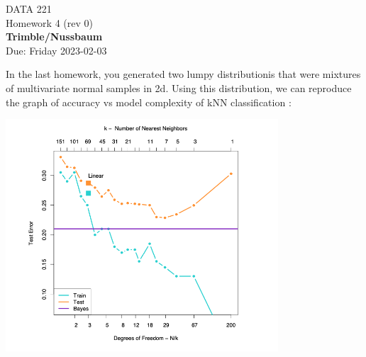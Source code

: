 \documentclass[12pt]{book}
\theoremstyle{definition}
\begin{document}
\begin{center}
{\Large DATA 221 \\  Homework 4  (rev 0)}\\
\textbf{Trimble/Nussbaum}\\ %
Due: Friday 2023-02-03 
\end{center}

\vspace{0.2 cm}
In the last homework, you generated two lumpy distributionis that were mixtures of multivariate normal samples in 2d.
Using this distribution, we can reproduce the graph of accuracy vs model complexity of kNN classification :

\includegraphics[width=4in]{src/hastie-generalization.png}
\end{document}
